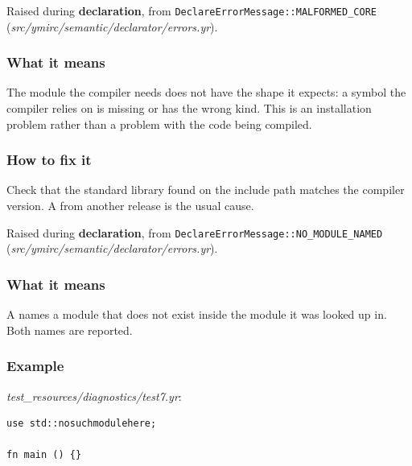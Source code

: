 Raised during \textbf{declaration}, from \texttt{DeclareErrorMessage::\allowbreak{}MALFORMED\_\allowbreak{}CORE} (\textit{src/\allowbreak{}ymirc/\allowbreak{}semantic/\allowbreak{}declarator/\allowbreak{}errors.yr}).

\subsubsection*{What it means}

The  module the compiler needs does not have the shape it expects: a symbol the compiler relies on is missing or has the wrong kind. This is an installation problem rather than a problem with the code being compiled.

\subsubsection*{How to fix it}

Check that the standard library found on the include path matches the compiler version. A  from another release is the usual cause.

\label{sec:codes:e3012}

Raised during \textbf{declaration}, from \texttt{DeclareErrorMessage::\allowbreak{}NO\_\allowbreak{}MODULE\_\allowbreak{}NAMED} (\textit{src/\allowbreak{}ymirc/\allowbreak{}semantic/\allowbreak{}declarator/\allowbreak{}errors.yr}).

\subsubsection*{What it means}

A  names a module that does not exist inside the module it was looked up in. Both names are reported.

\subsubsection*{Example}

\textit{test\_\allowbreak{}resources/\allowbreak{}diagnostics/\allowbreak{}test7.yr}:

\begin{lstlisting}[style=coloredverbatimError]
use std::nosuchmodulehere;

fn main () {}
\end{lstlisting}

